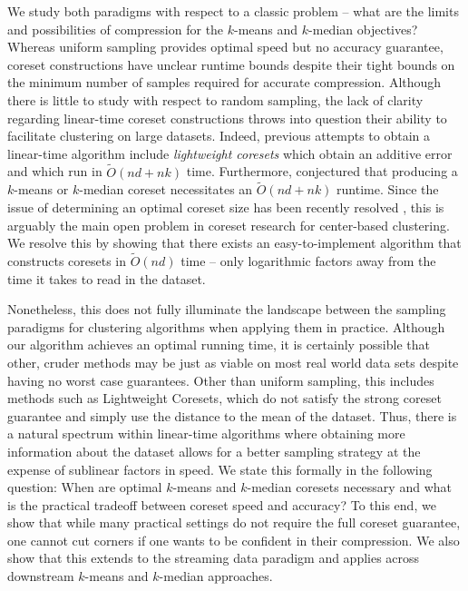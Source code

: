 We study both paradigms with respect to a classic problem -- what are the limits and possibilities of compression for the $k$-means and $k$-median objectives?
Whereas uniform sampling provides optimal speed but no accuracy guarantee, coreset constructions have
unclear runtime bounds despite their tight bounds on the minimum number of samples required for accurate compression. Although there is little to study with respect to random
sampling, the lack of clarity regarding linear-time coreset constructions throws into question their ability to facilitate clustering on large datasets. Indeed,
previous attempts to obtain a linear-time algorithm include \emph{lightweight coresets} \cite{BachemL018} which obtain an additive error and \cite{DSWY22} which
run in $\tilde{O}(nd + nk)$ time. Furthermore, \cite{DSWY22} conjectured that producing a $k$-means or $k$-median coreset necessitates an $\tilde{O}(nd + nk)$ runtime.
Since the issue of determining an optimal coreset size has been recently resolved \cite{CSS21,CLSSS22,HLW23}, this is arguably the main open problem in coreset
research for center-based clustering. We resolve this by showing that there exists an easy-to-implement algorithm that constructs coresets in $\tilde{O}(nd)$
time -- only logarithmic factors away from the time it takes to read in the dataset.

Nonetheless, this does not fully illuminate the landscape between the sampling paradigms for clustering algorithms when applying them in practice. Although our algorithm achieves an optimal
running time, it is certainly possible that other, cruder methods may be just as viable on most real world data sets despite having no worst case guarantees. Other than uniform
sampling, this includes methods such as Lightweight Coresets, which do not satisfy the strong coreset guarantee and simply use the distance to the mean
of the dataset. Thus, there is a natural spectrum within linear-time algorithms where obtaining more information about the dataset allows for a better
sampling strategy at the expense of sublinear factors in speed. We state this formally in the following question: When are optimal $k$-means and $k$-median
coresets necessary and what is the practical tradeoff between coreset speed and accuracy? To this end, we show that while many practical settings do not require
the full coreset guarantee, one cannot cut corners if one wants to be confident in their compression. We also
show that this extends to the streaming data paradigm and applies across downstream $k$-means and $k$-median approaches.
